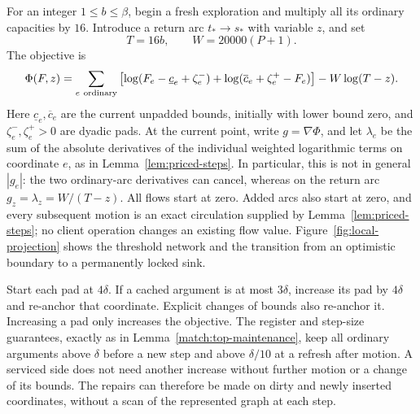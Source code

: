For an integer \(1\le b\le\beta\), begin a fresh exploration and
multiply all its ordinary capacities by \(16\).  Introduce a return
arc \(t_*\to s_*\) with variable \(z\), and set
\begin{equation}
\label{proj:threshold-network}
                       T=16b,\qquad W=20000(P+1).
\end{equation}
The objective is
\begin{equation}
\label{proj:objective}
 \Phi(F,z)=
 \sum_{e\ {\rm ordinary}}
  \left[\log(F_e-\underline c_e+\zeta_e^-)
       +\log(\overline c_e+\zeta_e^+-F_e)\right]
                         -W\log(T-z).
\end{equation}
Here \(\underline c_e,\overline c_e\) are the current unpadded
bounds, initially with lower bound zero, and
\(\zeta_e^-,\zeta_e^+>0\) are dyadic pads.
At the current point, write \(g=\nabla\Phi\), and let \(\lambda_e\)
be the sum of the absolute derivatives of the individual weighted
logarithmic terms on coordinate \(e\), as in
Lemma~\ref{lem:priced-steps}.  In particular, this is not in general
\(|g_e|\): the two ordinary-arc derivatives can cancel, whereas
on the return arc \(g_z=\lambda_z=W/(T-z)\).
All flows start at zero.  Added arcs also start at zero, and every
subsequent motion is an exact circulation supplied by
Lemma~\ref{lem:priced-steps}; no client operation changes an existing
flow value.
Figure~\ref{fig:local-projection} shows the threshold network and the
transition from an optimistic boundary to a permanently locked sink.


Start each pad at \(4\delta\).  If a cached argument is at most
\(3\delta\), increase its pad by \(4\delta\) and re-anchor that
coordinate.  Explicit changes of bounds also re-anchor it.
Increasing a pad only increases the objective.  The register and
step-size guarantees, exactly as in Lemma~\ref{match:top-maintenance},
keep all ordinary arguments above \(\delta\) before a new step and
above \(\delta/10\) at a refresh after motion.  A serviced side does
not need another increase without further motion or a change of
its bounds.  The repairs can therefore be made on dirty and newly
inserted coordinates, without a scan of the represented graph at
each step.

